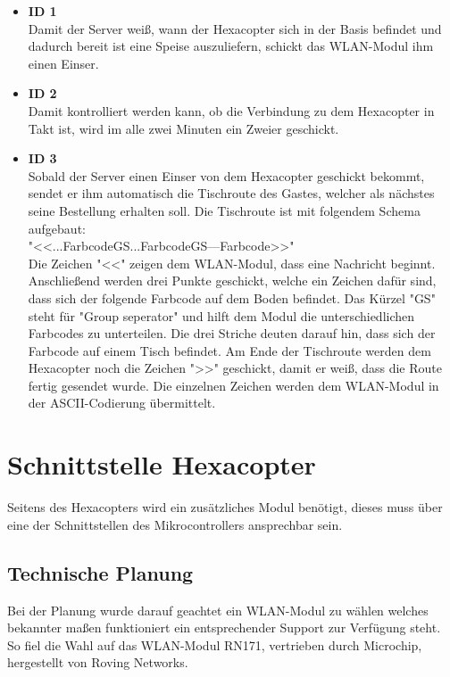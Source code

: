 \begin{itemize}
    \item \textbf{ID 1}\\
Damit der Server weiß, wann der Hexacopter sich in der Basis befindet und dadurch bereit ist eine Speise auszuliefern, schickt das WLAN-Modul ihm einen Einser.

    \item \textbf{ID 2}\\
Damit kontrolliert werden kann, ob die Verbindung zu dem Hexacopter in Takt ist, wird im alle zwei Minuten ein Zweier geschickt. 

    \item \textbf{ID 3}\\
Sobald der Server einen Einser von dem Hexacopter geschickt bekommt, sendet er ihm automatisch die Tischroute des Gastes, welcher als nächstes seine Bestellung erhalten soll.
Die Tischroute ist mit folgendem Schema aufgebaut: \\
"<<...FarbcodeGS...FarbcodeGS---Farbcode>>" \\
Die Zeichen "<<" zeigen dem WLAN-Modul, dass eine Nachricht beginnt. 
Anschließend werden drei Punkte geschickt, welche ein Zeichen dafür sind, dass sich der folgende Farbcode auf dem Boden befindet.
Das Kürzel "GS" steht für "Group seperator" und hilft dem Modul die unterschiedlichen Farbcodes zu unterteilen.
Die drei Striche deuten darauf hin, dass sich der Farbcode auf einem Tisch befindet.
Am Ende der Tischroute werden dem Hexacopter noch die Zeichen ">>" geschickt, damit er weiß, dass die Route fertig gesendet wurde.
Die einzelnen Zeichen werden dem WLAN-Modul in der ASCII-Codierung übermittelt.
  \end{itemize}  
  
\section{Schnittstelle Hexacopter}
Seitens des Hexacopters wird ein zusätzliches Modul benötigt, dieses muss über eine der Schnittstellen des Mikrocontrollers ansprechbar sein.

  \subsection{Technische Planung}
  Bei der Planung wurde darauf geachtet ein WLAN-Modul zu wählen welches bekannter maßen funktioniert \bzw ein entsprechender Support zur Verfügung steht.
  So fiel die Wahl auf das WLAN-Modul RN171, vertrieben durch Microchip, hergestellt von Roving Networks.

